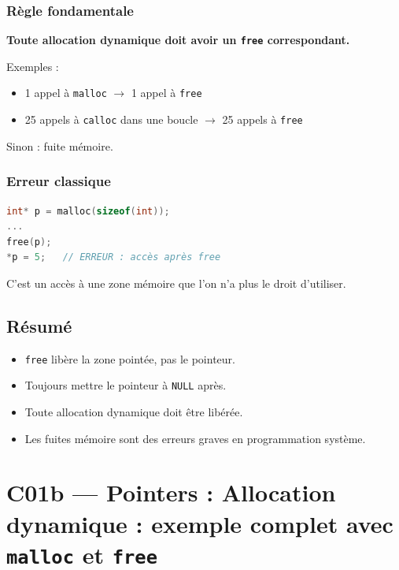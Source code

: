 \subsubsection{Règle fondamentale}

\begin{center}
\textbf{Toute allocation dynamique doit avoir un \texttt{free} correspondant.}
\end{center}

Exemples :

\begin{itemize}
    \item 1 appel à \texttt{malloc} $\rightarrow$ 1 appel à \texttt{free}
    \item 25 appels à \texttt{calloc} dans une boucle $\rightarrow$
          25 appels à \texttt{free}
\end{itemize}

Sinon : fuite mémoire.

\subsubsection{Erreur classique}

\begin{lstlisting}[language=C]
int* p = malloc(sizeof(int));
...
free(p);
*p = 5;   // ERREUR : accès après free
\end{lstlisting}

C’est un accès à une zone mémoire que l’on n’a plus le droit d’utiliser.

\subsection*{Résumé}

\begin{itemize}
    \item \texttt{free} libère la zone pointée, pas le pointeur.
    \item Toujours mettre le pointeur à \texttt{NULL} après.
    \item Toute allocation dynamique doit être libérée.
    \item Les fuites mémoire sont des erreurs graves en programmation système.
\end{itemize}

\section{C01b — Pointers : Allocation dynamique : exemple complet avec \texttt{malloc} et \texttt{free}}

